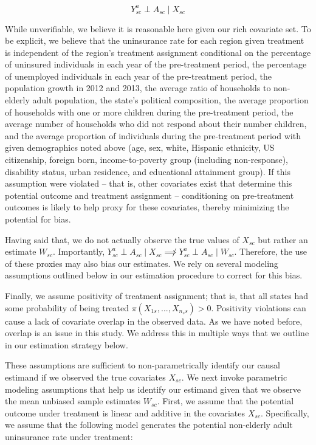 \documentclass[12pt]{article}
\begin{document}
$$
Y_{sc}^a \perp A_{sc} \mid X_{sc}
$$

While unverifiable, we believe it is reasonable here given our rich covariate set. To be explicit, we believe that the uninsurance rate for each region given treatment is independent of the region's treatment assignment conditional on the percentage of uninsured individuals in each year of the pre-treatment period, the percentage of unemployed individuals in each year of the pre-treatment period, the population growth in 2012 and 2013, the average ratio of households to non-elderly adult population, the state's political composition, the average proportion of households with one or more children during the pre-treatment period, the average number of households who did not respond about their number children, and the average proportion of individuals during the pre-treatment period with given demographics noted above (age, sex, white, Hispanic ethnicity, US citizenship, foreign born, income-to-poverty group (including non-response), disability status, urban residence, and educational attainment group). If this assumption were violated -- that is, other covariates exist that determine this potential outcome and treatment assignment -- conditioning on pre-treatment outcomes is likely to help proxy for these covariates, thereby minimizing the potential for bias. 

Having said that, we do not actually observe the true values of $X_{sc}$ but rather an estimate $W_{sc}$. Importantly, $Y_{sc}^a \perp A_{sc} \mid X_{sc} \not\implies Y_{sc}^a \perp A_{sc} \mid W_{sc}$. Therefore, the use of these proxies may also bias our estimates. We rely on several modeling assumptions outlined below in our estimation procedure to correct for this bias.

Finally, we assume positivity of treatment assignment; that is, that all states had some probability of being treated $\pi(X_{1s}, ..., X_{n_ss}) > 0$. Positivity violations can cause a lack of covariate overlap in the observed data. As we have noted before, overlap is an issue in this study. We address this in multiple ways that we outline in our estimation strategy below. 

These assumptions are sufficient to non-parametrically identify our causal estimand if we observed the true covariates $X_{sc}$. We next invoke parametric modeling assumptions that help us identify our estimand given that we observe the  mean unbiased sample estimates $W_{sc}$. First, we assume that the potential outcome under treatment is linear and additive in the covariates $X_{sc}$. Specifically, we assume that the following model generates the potential non-elderly adult uninsurance rate under treatment:
\end{document}

